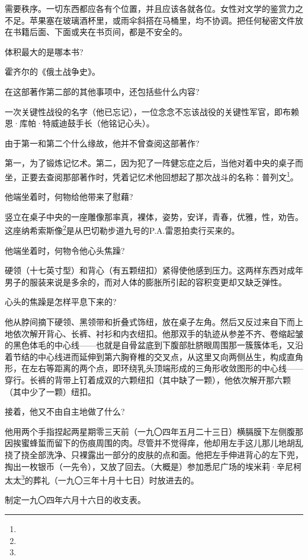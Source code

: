 \par 需要秩序。一切东西都应各有个位置，并且应该各就各位。女性对文学的鉴赏力之不足。苹果塞在玻璃酒杯里，或雨伞斜搭在马桶里，均不协调。把任何秘密文件放在书籍后面、下面或夹在书页间，都是不安全的。
\par 体积最大的是哪本书?
\par 霍齐尔的《俄土战争史》。
\par 在这部著作第二部的其他事项中，还包括些什么内容?
\par 一次关键性战役的名字（他已忘记），一位念念不忘该战役的关键性军官，即布赖恩·库帕·特威迪鼓手长（他铭记心头）。
\par 由于第一和第二个什么缘故，他并不曾查阅这部著作?
\par 第一，为了锻炼记忆术。第二，因为犯了一阵健忘症之后，当他对着中央的桌子而坐，正要去查阅那部著作时，凭着记忆术他回想起了那次战斗的名称：普列文\footnote{}。
\par 他端坐着时，何物给他带来了慰藉?
\par 竖立在桌子中央的一座雕像那率真，裸体，姿势，安详，青春，优雅，性，劝告。这座纳希索斯像\footnote{}是从巴切勒步道九号的P.A.雷恩拍卖行买来的。
\par 他端坐着时，何物令他心头焦躁?
\par 硬领（十七英寸型）和背心（有五颗纽扣）紧得使他感到压力。这两样东西对成年男子的服装来说是多余的，而对人体的膨胀所引起的容积变更却又缺乏弹性。
\par 心头的焦躁是怎样平息下来的?
\par 他从脖间摘下硬领、黑领带和折叠式饰纽，放在桌子左角。然后又反过来自下而上地依次解开背心、长裤、衬衫和内衣纽扣。他那双手的轨迹从参差不齐、卷缩起皱的黑色体毛的中心线——也就是自骨盆底到下腹部肚脐眼周围那一簇簇体毛，又沿着节结的中心线进而延伸到第六胸脊椎的交叉点，从这里又向两侧丛生，构成直角形，在左右等距离的两个点，即环绕乳头顶端形成的三角形收敛图形的中心线——穿行。长裤的背带上钉着成双的六颗纽扣（其中缺了一颗），他依次解开那六颗（其中少了一颗）纽扣。
\par 接着，他又不由自主地做了什么?
\par 他用两个手指捏起两星期零三天前（一九〇四年五月二十三日）横膈膜下左侧腹那因挨蜜蜂蜇而留下的伤痕周围的肉。尽管并不觉得痒，他却用左手这儿那儿地胡乱挠了挠全部洗净、只裸露出一部分的皮肤的点和面。他把左手伸进背心的左下兜，掏出一枚银币（一先令），又放了回去。（大概是）参加悉尼广场的埃米莉·辛尼柯太太\footnote{}的葬礼（一九〇三年十月十七日）时放进去的。
\par 制定一九〇四年六月十六日的收支表。

